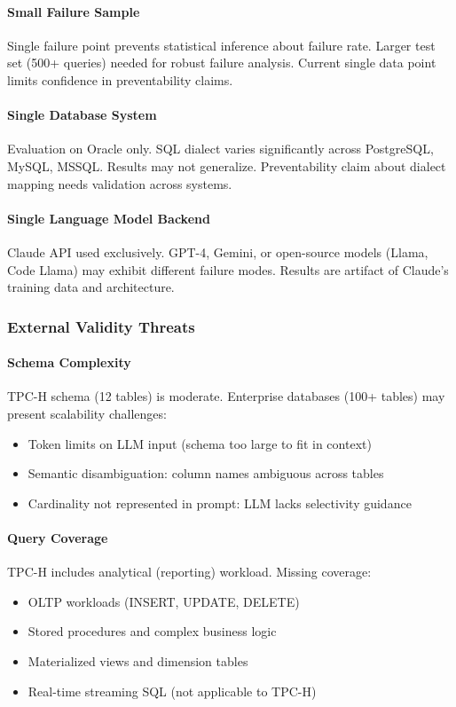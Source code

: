 \paragraph{Small Failure Sample}
Single failure point prevents statistical inference about failure rate. Larger test set (500+ queries) needed for robust failure analysis. Current single data point limits confidence in preventability claims.

\paragraph{Single Database System}
Evaluation on Oracle only. SQL dialect varies significantly across PostgreSQL, MySQL, MSSQL. Results may not generalize. Preventability claim about dialect mapping needs validation across systems.

\paragraph{Single Language Model Backend}
Claude API used exclusively. GPT-4, Gemini, or open-source models (Llama, Code Llama) may exhibit different failure modes. Results are artifact of Claude's training data and architecture.

\subsubsection{External Validity Threats}

\paragraph{Schema Complexity}
TPC-H schema (12 tables) is moderate. Enterprise databases (100+ tables) may present scalability challenges:
\begin{itemize}
    \item Token limits on LLM input (schema too large to fit in context)
    \item Semantic disambiguation: column names ambiguous across tables
    \item Cardinality not represented in prompt: LLM lacks selectivity guidance
\end{itemize}

\paragraph{Query Coverage}
TPC-H includes analytical (reporting) workload. Missing coverage:
\begin{itemize}
    \item OLTP workloads (INSERT, UPDATE, DELETE)
    \item Stored procedures and complex business logic
    \item Materialized views and dimension tables
    \item Real-time streaming SQL (not applicable to TPC-H)
\end{itemize}

